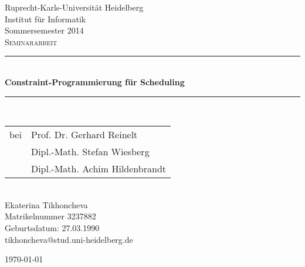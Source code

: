 \begin{titlepage}
  \begin{center}
	{\large Ruprecht-Karls-Universität Heidelberg}\\ [0.5cm]
	{\large Institut für Informatik} \\ [0.5cm]
	{\large Sommersemester 2014}\\ [3cm]
	
	




\textsc{\LARGE Seminararbeit}\\[1.5cm]


\newcommand{\HRule}{\rule{\linewidth}{0.5mm}}
\HRule \\[0.4cm]
{ \huge \bfseries Constraint-Programmierung für Scheduling }\\[0.4cm]

\HRule \\[1.5cm]

{\large
	\begin{tabular}{ll}
	bei  & Prof. Dr. Gerhard Reinelt\\
	     & Dipl.-Math. Stefan Wiesberg\\
	     & Dipl.-Math. Achim Hildenbrandt
	\end{tabular}
}
\\[3.0cm]


{\Large 
	Ekaterina Tikhoncheva \\
	Matrikelnummer 3237882 \\
	Geburtsdatum: 27.03.1990 \\
	tikhoncheva@stud.uni-heidelberg.de
}
	
\vfill
{\large \today}

  \end{center} 
\end{titlepage}